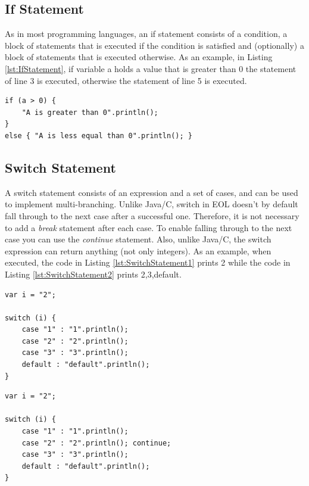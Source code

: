 \subsection{If Statement}

As in most programming languages, an if statement consists of a condition, a block of statements that is executed if the condition is satisfied and (optionally) a block of statements that is executed otherwise. As an example, in Listing \ref{lst:IfStatement}, if variable a holds a value that is greater than 0 the statement of line 3 is executed, otherwise the statement of line 5 is executed.

\begin{lstlisting}[float=h, caption=Example illustrating an if statement, label=lst:IfStatement, language=EOL]
if (a > 0) {
	"A is greater than 0".println();
}
else { "A is less equal than 0".println(); }
\end{lstlisting}

\subsection{Switch Statement}

A switch statement consists of an expression and a set of cases, and can be used to implement multi-branching. Unlike Java/C, switch in EOL doesn't by default fall through to the next case after a successful one. Therefore, it is not necessary to add a \emph{break} statement after each case. To enable falling through to the next case you can use the \emph{continue} statement. Also, unlike Java/C, the switch expression can return anything (not only integers). As an example, when executed, the code in Listing \ref{lst:SwitchStatement1} prints 2 while the code in Listing \ref{lst:SwitchStatement2} prints 2,3,default.

\begin{lstlisting}[float=h, caption=Example illustrating a switch statement, label=lst:SwitchStatement1, language=EOL]
var i = "2";

switch (i) {
	case "1" : "1".println(); 
	case "2" : "2".println();
	case "3" : "3".println();
	default : "default".println(); 
}
\end{lstlisting}

\begin{lstlisting}[float=h, caption=Example illustrating falling through cases in a switch statement, label=lst:SwitchStatement2, language=EOL]
var i = "2";

switch (i) {
	case "1" : "1".println(); 
	case "2" : "2".println(); continue;
	case "3" : "3".println();
	default : "default".println(); 
}
\end{lstlisting}

